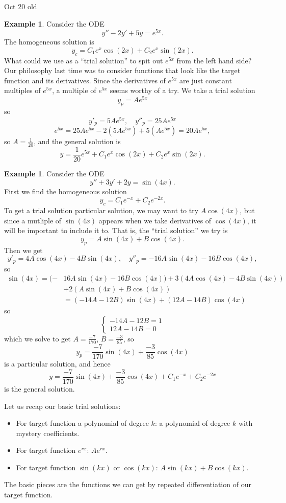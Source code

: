 \documentclass[12pt]{amsart}
\numberwithin{equation}{section}
\theoremstyle{plain} %
\newcommand{\Oct}[1]{Oct #1 old}
\theoremstyle{definition}
\newtheorem{ex}[equation]{Example}
\theoremstyle{remark}
\begin{document}
\Oct{20}

\begin{ex} Consider the ODE
\[ y'' - 2y' + 5y = e^{5x}.\]
The homogeneous solution is
\[ y_c =C_1 e^{x}\cos(2x) + C_2 e^{x}\sin(2x).\]
What could we use as a ``trial solution'' to spit out $e^{5x}$ from the left hand side? Our philosophy last time was to consider functions that look like the target function and its derivatives. Since the derivatives of $e^{5x}$ are just constant multiples of $e^{5x}$, a multiple of $e^{5x}$ seems worthy of a try.
We take a trial solution 
\[y_p = A e^{5x}\]
so
\[ y'_p = 5A e^{5x}, \quad y''_p = 25 Ae^{5x}\]
\[ e^{5x} = 25A e^{5x} - 2(5A e^{5x}) + 5(A e^{5x}) = 20A e^{5x},\]
so $A=\frac{1}{20}$, and the general solution is
\[ y= \frac{1}{20} e^{5x} + C_1 e^{x}\cos(2x) + C_2 e^{x}\sin(2x).\]
\end{ex}

\begin{ex} Consider the ODE
\[ y'' + 3y' + 2y= \sin(4x).\]
First we find the homogeneous solution
\[ y_c = C_1 e^{-x} + C_2 e^{-2x}.\]
To get a trial solution particular solution, we may want to try $A \cos(4x)$, but since a mutliple of $\sin(4x)$ appears when we take derivatives of $\cos(4x)$, it will be important to include it to. That is, the ``trial solution'' we try is
\[ y_p = A \sin(4x) + B \cos(4x).\]
Then we get 
\[ y'_p = 4A\cos(4x) - 4B \sin(4x), \quad y''_p = - 16A \sin(4x) - 16B\cos(4x),\]
so
\begin{align*} \sin(4x) = (- &16A \sin(4x) - 16B\cos(4x)) + 3 (4A\cos(4x) - 4B \sin(4x)) \\&+ 2(A \sin(4x) + B \cos(4x)) \\&= (-14A-12B) \sin(4x) + (12A-14B) \cos(4x)\end{align*}
so \[ \begin{cases} -14A-12B =1 \\
12A-14B=0\end{cases}\]
which we solve to get $A=\frac{-7}{170}$, $B=\frac{-3}{85}$, so 
\[ y_p = \frac{-7}{170} \sin(4x) + \frac{-3}{85} \cos(4x)\]
is a particular solution, and hence
\[y=\frac{-7}{170} \sin(4x) + \frac{-3}{85} \cos(4x) +C_1 e^{-x} + C_2 e^{-2x}\]
is the general solution.
\end{ex}

Let us recap our basic trial solutions:
\begin{itemize}
\item For target function a polynomial of degree $k$: a polynomial of degree $k$ with mystery coefficients.
\item For target function $e^{rx}$: $Ae^{rx}$.
\item For target function $\sin(kx)$ or $\cos(kx)$: $A \sin(kx) + B \cos(kx)$.
\end{itemize}
The basic pieces are the functions we can get by repeated differentiation of our target function.
\end{document}
